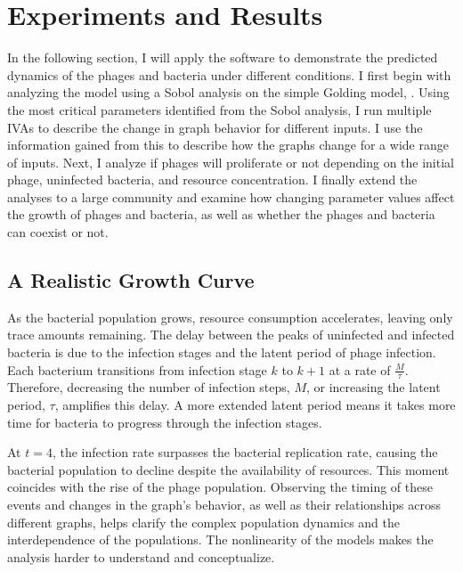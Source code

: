 \chapter{Experiments and Results}
\label{AER}

In the following section, I will apply the software to demonstrate the predicted dynamics of the phages and bacteria under different conditions. 
I first begin with analyzing the model using a Sobol analysis on the simple Golding model, . 
Using the most critical parameters identified from the Sobol analysis, I run multiple IVAs to describe the change in graph behavior for different inputs. 
I use the information gained from this to describe how the graphs change for a wide range of inputs. 
Next, I analyze if phages will proliferate or not depending on the initial phage, uninfected bacteria, and resource concentration. 
I finally extend the analyses to a large community and examine how changing parameter values affect the growth of phages and bacteria, as well as whether the phages and bacteria can coexist or not. 

\section{A Realistic Growth Curve}
As the bacterial population grows, resource consumption accelerates, leaving only trace amounts remaining. 
The delay between the peaks of uninfected and infected bacteria is due to the infection stages and the latent period of phage infection. 
Each bacterium transitions from infection stage $k$ to $k+1$ at a rate of $\frac{M}{\tau}$. 
Therefore, decreasing the number of infection steps, $M$, or increasing the latent period, $\tau$, amplifies this delay. 
A more extended latent period means it takes more time for bacteria to progress through the infection stages.

At $t=4$, the infection rate surpasses the bacterial replication rate, causing the bacterial population to decline despite the availability of resources. 
This moment coincides with the rise of the phage population. 
Observing the timing of these events and changes in the graph's behavior, as well as their relationships across different graphs, helps clarify the complex population dynamics and the interdependence of the populations. 
The nonlinearity of the models makes the analysis harder to understand and conceptualize. 

